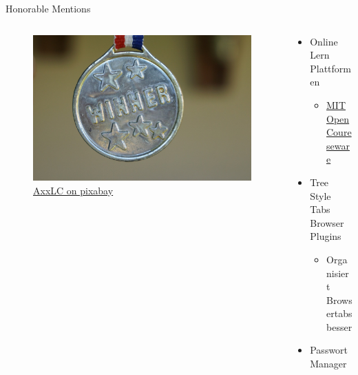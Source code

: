 \documentclass[aspectratio=169,shownotes]{beamer}
\begin{document}
\begin{frame}{Honorable Mentions}
    \begin{columns}[t]
        \begin{column}{0.4\textwidth}
            \vspace{-2em} 
            \begin{figure}
                \begin{flushleft}
                    \includegraphics[height=0.8\textheight,trim={4cm 0 17cm 0},clip]{graphics/winner-1548239_1280.jpg}
                    \caption*{\href{https://pixabay.com/photos/winner-medal-gold-award-success-1548239/}{AxxLC on pixabay}}    
                \end{flushleft}                
            \end{figure}            
        \end{column}
        \begin{column}{0.6\textwidth}
            \begin{itemize}
                \item Online Lern Plattformen
                \begin{itemize}
                    \item \href{https://ocw.mit.edu/}{MIT Open Coureseware}
                \end{itemize}  
                \item Tree Style Tabs Browser Plugins
                \begin{itemize}
                    \item Organisiert Browsertabs besser
                \end{itemize}  
                \item Passwort Manager

\end{itemize}
\end{column}
\end{columns}
\end{frame}
\end{document}
